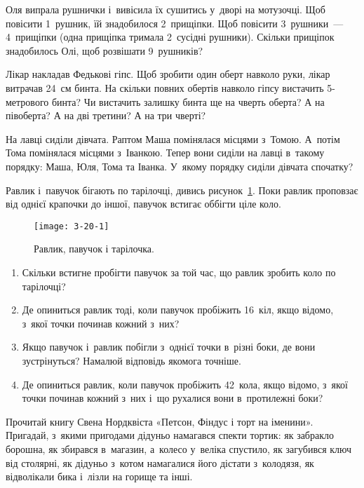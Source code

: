 \problem
Оля випрала рушнички і~вивісила їх сушитись у~дворі на мотузочці.
Щоб повісити 1~рушник, їй знадобилося 2~прищіпки.
Щоб повісити 3~рушники~--- 4~прищіпки (одна прищіпка тримала 2~сусідні рушники).
Скільки прищіпок знадобилось Олі, щоб розвішати 9~рушників?


\problem
Лікар накладав Федькові гіпс.
Щоб зробити один оберт навколо руки, лікар витрачав 24~см бинта.
На скільки повних обертів навколо гіпсу вистачить 5-метрового бинта?
Чи вистачить залишку бинта ще на чверть оберта?
А на півоберта?
А на дві третини?
А на три чверті?


\problem
На лавці сиділи дівчата. Раптом Маша помінялася місцями з~Томою.
А~потім Тома помінялася місцями з~Іванкою.
Тепер вони сиділи на лавці в~такому порядку: Маша, Юля, Тома та Іванка.
У~якому порядку сиділи дівчата спочатку?


\problem
{}
Равлик і~павучок бігають по тарілочці,
дивись рисунок~\ref{fig:snail-spider-plate}.
Поки равлик проповзає від однієї крапочки до іншої,
павучок встигає оббігти ціле коло.

\begin{figure}[ht]
  \centering
  \texttt{[image: 3-20-1]}
  \caption{Равлик, павучок і тарілочка.}
  \label{fig:snail-spider-plate}
\end{figure}

\begin{enumerate}
  \item Скільки встигне пробігти павучок за той час,
  що равлик зробить коло по тарілочці?
  \item Де опиниться равлик тоді, коли павучок пробіжить 16~кіл,
  якщо відомо, з~якої точки починав кожний з~них?
  \item Якщо павучок і~равлик побігли з~однієї точки в~різні боки,
  де вони зустрінуться?
  Намалюй відповідь якомога точніше.
  \item Де опиниться равлик, коли павучок пробіжить 42~кола, якщо відомо,
  з~якої точки починав кожний з~них і~що рухалися вони в~протилежні боки?
\end{enumerate}


\problem
Прочитай книгу Свена Нордквіста «Петсон, Фіндус і торт на іменини». Пригадай,
з~якими пригодами дідуньо намагався спекти тортик: як забракло борошна,
як збирався в~магазин, а~колесо у~веліка спустило, як загубився ключ
від столярні, як дідуньо з~котом намагалися його дістати з~колодязя,
як відволікали бика і~лізли на горище та інші.

